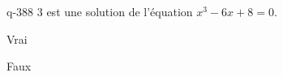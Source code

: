 \begin{truefalse}{q-388}
$3$ est une solution de l'équation $x^3-6x+8=0$.
\item Vrai
\item* Faux
\end{truefalse}

